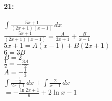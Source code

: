 \documentclass[12pt]{article}
\begin{document}
    
    \paragraph*{21:\\}
    $\int\! \frac{5x + 1}{(2x + 1)(x - 1)} \, dx$\\
    $\frac{5x + 1}{(2x + 1)(x - 1)} = \frac{A}{2x + 1} + \frac{B}{x - 1}$\\
    $5x + 1 = A(x-1) + B(2x + 1)$\\
    $6 = 3B$\\
    $B = 2$\\
    $\frac{1}{2} = -\frac{3A}{2}$\\
    $A = -\frac{1}{3}$\\
    $\int\! \frac{-\frac{1}{3}}{2x + 1} \, dx + \int\! \frac{2}{x-1}\,dx$\\
    $= -\frac{\ln{2x +1}}{6} + 2\ln{x-1}$\\
    


\thispagestyle{fancy}
\end{document}
